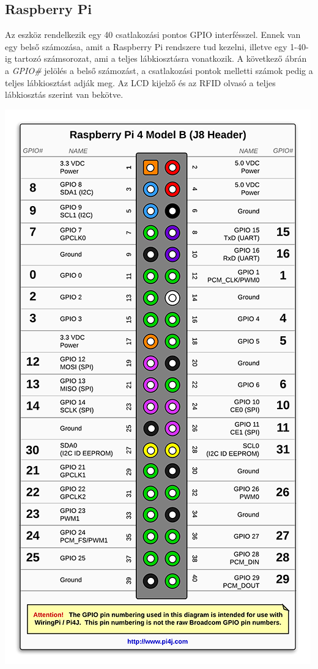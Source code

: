 \documentclass[11pt, a4paper]{article}
\begin{document}
		\subsection{Raspberry Pi}
		\begin{flushleft}
			\justifying
			Az eszköz rendelkezik egy 40 csatlakozási pontos GPIO interfésszel. Ennek van egy belső számozása, amit a Raspberry Pi rendszere tud kezelni, illetve egy 1-40-ig tartozó számsorozat, ami a teljes lábkiosztásra vonatkozik. A következő ábrán a \emph{GPIO\#} jelölés a belső számozást, a csatlakozási pontok melletti számok pedig a teljes lábkiosztást adják meg. Az LCD kijelző és az RFID olvasó a teljes lábkiosztás szerint van bekötve.
		\end{flushleft}
			\begin{minipage}{\linewidth}
				\centering
				\includegraphics[width=0.7\linewidth]{img/rpi_pinout}
				\label{fig:2rpipinout}
			\end{minipage}
			
\end{document}

